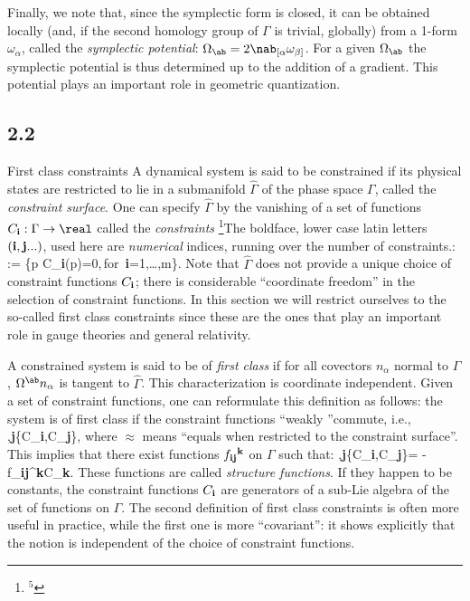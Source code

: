 Finally, we note that, since the symplectic form is closed, it can be obtained
locally (and, if the second homology group of $\Gamma$ is trivial, globally)
from a 1-form $\omega_\alpha$, called the {\it symplectic potential}:
$\Omega_\ab=2\nab_{[\alpha}\omega_{\beta]}$. For a given $\Omega_{\ab}$
the symplectic potential is thus determined up to the addition of a gradient.
This potential plays an important role in geometric quantization.
%
\goodbreak
\subsection{2.2}{First class constraints}
%
A dynamical system is said to be constrained if its physical states are
restricted to lie in a submanifold $\hat\Gamma$ of the phase space $\Gamma$,
called the {\it constraint surface}. One can specify $\hat\Gamma$ by the
vanishing of a set of functions $C_{\bf i}:\Gamma\to\real$ called the
{\it constraints}
\footnote{$^5$}{The boldface, lower case latin letters $({\bf i}, {\bf
j}...)$, used here are {\it numerical} indices, running over the number of
constraints.}:
  \bneq
  \hat\Gamma:= \{p\in\Gamma\,\vert\,C_{\bf i}(p)=0,\,{\rm for}\
  {\bf i}=1,\ldots,m\}.
Note that $\hat\Gamma$ does not provide a unique choice of constraint
functions $C_{\bf i}$; there is considerable ``coordinate freedom'' in
the selection of constraint functions. In this section we will restrict
ourselves to the so-called first class constraints since these are the
ones that play an important role in gauge theories and general relativity.

A constrained system is said to be of {\it first class} if for all covectors
$n_\alpha$ normal to $\hat\Gamma$, $\Omega^\ab n_\alpha$ is tangent to
$\hat\Gamma$. This characterization is coordinate independent. Given a set
of constraint functions, one can reformulate this definition as follows:
the system is of first class if the constraint functions ``weakly ''commute,
i.e.,
\bneq
 ,{\bf j}\qquad\{C_{\bf i},C_{\bf j}\},
where $\approx$ means ``equals when restricted to the constraint surface''.
This implies that there exist functions $f_{{\bf ij}}{}^{\bf k}$ on
$\Gamma$ such that:
\bneq
{},{\bf j}\qquad\{C_{\bf i},C_{\bf j}\}=
 -f_{{\bf ij}}{}^{\bf k}C_{\bf k}.
These functions are called {\it structure functions}. If they happen to be
constants, the constraint functions $C_{\bf i}$ are generators of a sub-Lie
algebra of the set of functions on $\Gamma$. The second definition of first
class constraints is often more useful in practice, while the first one is
more ``covariant'': it shows explicitly that the notion is independent of
the choice of constraint functions.

